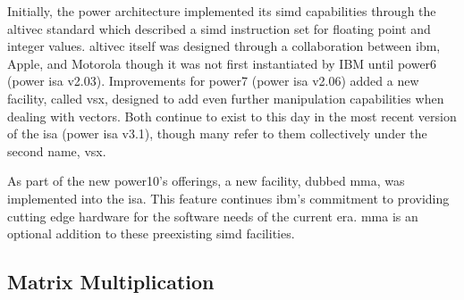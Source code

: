 \documentclass[\main/thesis.tex]{subfiles}
\begin{document}
Initially, the \gls{power} architecture implemented its \gls{simd} capabilities through the \gls{altivec} standard which described a \gls{simd} instruction set for floating point and integer values.
\Gls{altivec} itself was designed through a collaboration between \gls{ibm}, Apple, and Motorola though it was not first instantiated by IBM until \gls{power}6 (\gls{power} \gls{isa} v2.03).
Improvements for \gls{power}7 (\gls{power} \gls{isa} v2.06) added a new facility, called \gls{vsx}, designed to add even further manipulation capabilities when dealing with vectors.
Both continue to exist to this day in the most recent version of the \gls{isa} (\gls{power} \gls{isa} v3.1), though many refer to them collectively under the second name, \gls{vsx}.

As part of the new \gls{power10}'s offerings, a new facility, dubbed \gls{mma}, was implemented into the \gls{isa}.
This feature continues \gls{ibm}'s commitment to providing cutting edge hardware for the software needs of the current era.
\gls{mma} is an optional addition to these preexisting \gls{simd} facilities.

\subsection{Matrix Multiplication}
\end{document}
